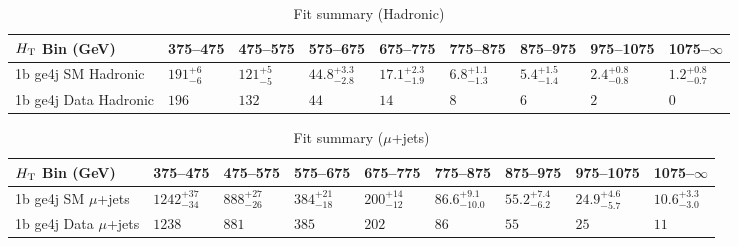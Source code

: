 \documentclass[8pt]{article}
\def\scalht{\mbox{$H_{\rm{T}}$}\xspace}
\newcommand\T{\rule{0pt}{2.6ex}}
\begin{document}
\begin{table}[ht!]
\caption{Fit summary (Hadronic)}
\label{tab:ensemble-summary}
\centering
\begin{tabular}{ lllllllll }

\hline
\scalht Bin (GeV)       & 375--475                       & 475--575                       & 575--675                       & 675--775                       & 775--875                       & 875--975                       & 975--1075                      & 1075--$\infty$                 \\ [1.000000ex]
\hline
1b ge4j SM Hadronic\T   & $191^{+6}_{-6}$                & $121^{+5}_{-5}$                & $44.8^{+3.3}_{-2.8}$           & $17.1^{+2.3}_{-1.9}$           & $6.8^{+1.1}_{-1.3}$            & $5.4^{+1.5}_{-1.4}$            & $2.4^{+0.8}_{-0.8}$            & $1.2^{+0.8}_{-0.7}$            \\ 
1b ge4j Data Hadronic\T & $196$                          & $132$                          & $44$                           & $14$                           & $8$                            & $6$                            & $2$                            & $0$                            \\ 
\hline

\end{tabular}
\end{table}
\begin{table}[ht!]
\caption{Fit summary ($\mu$+jets)}
\label{tab:ensemble-summary}
\centering
\begin{tabular}{ lllllllll }

\hline
\scalht Bin (GeV)       & 375--475                       & 475--575                       & 575--675                       & 675--775                       & 775--875                       & 875--975                       & 975--1075                      & 1075--$\infty$                 \\ [1.000000ex]
\hline
1b ge4j SM $\mu$+jets\T & $1242^{+37}_{-34}$             & $888^{+27}_{-26}$              & $384^{+21}_{-18}$              & $200^{+14}_{-12}$              & $86.6^{+9.1}_{-10.0}$          & $55.2^{+7.4}_{-6.2}$           & $24.9^{+4.6}_{-5.7}$           & $10.6^{+3.3}_{-3.0}$           \\ 
1b ge4j Data $\mu$+jets\T & $1238$                         & $881$                          & $385$                          & $202$                          & $86$                           & $55$                           & $25$                           & $11$                           \\ 
\hline

\end{tabular}
\end{table}
\end{document}
